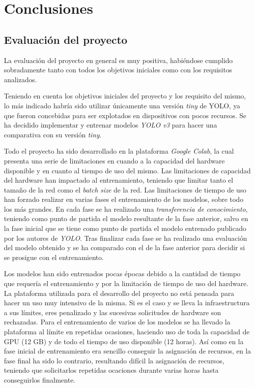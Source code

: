 \section{Conclusiones}
\label{sec:conclusiones}

\subsection{Evaluación del proyecto}

La evaluación del proyecto en general es muy positiva, habiéndose cumplido sobradamente tanto con todos los objetivos iniciales como con los requisitos analizados.

Teniendo en cuenta los objetivos iniciales del proyecto y los requisito del mismo, lo más indicado habría sido utilizar únicamente una versión \textit{tiny} de YOLO, ya que fueron concebidas para ser explotados en dispositivos con pocos recursos. Se ha decidido implementar y entrenar modelos \textit{YOLO v3} para hacer una comparativa con su versión \textit{tiny}.

Todo el proyecto ha sido desarrollado en la plataforma \textit{Google Colab}, la cual presenta una serie de limitaciones en cuando a la capacidad del hardware disponible y en cuanto al tiempo de uso del mismo. Las limitaciones de capacidad del hardware han impactado al entrenamiento, teniendo que limitar tanto el tamaño de la red como el \textit{batch size} de la red. Las limitaciones de tiempo de uso han forzado realizar en varias fases el entrenamiento de los modelos, sobre todo los más grandes. En cada fase se ha realizado una \textit{transferencia de conocimiento}, teniendo como punto de partida el modelo resultante de la fase anterior, salvo en la fase inicial que se tiene como punto de partida el modelo entrenado publicado por los autores de \textit{YOLO}. Tras finalizar cada fase se ha realizado una evaluación del modelo obtenido y se ha comparado con el de la fase anterior para decidir si se prosigue con el entrenamiento.

Los modelos han sido entrenados pocas épocas debido a la cantidad de tiempo que requería el entrenamiento y por la limitación de tiempo de uso del hardware. La plataforma utilizada para el desarrollo del proyecto no está pensada para hacer un uso muy intensivo de la misma. Si es el caso y se lleva la infraestructura a sus límites, eres penalizado y las sucesivas solicitudes de hardware son rechazadas. Para el entrenamiento de varios de los modelos se ha llevado la plataforma al límite en repetidas ocasiones, haciendo uso de toda la capacidad de GPU (12 GB) y de todo el tiempo de uso disponible (12 horas). Así como en la fase inicial de entrenamiento era sencillo conseguir la asignación de recursos, en la fase final ha sido lo contrario, resultando difícil la asignación de recursos, teniendo que solicitarlos repetidas ocaciones durante varias horas hasta conseguirlos finalmente.

